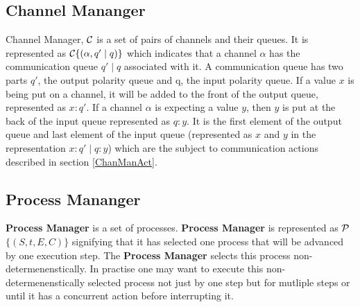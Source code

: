 \documentclass[11pt]{article}
\newcommand{\<}{\langle}
\renewcommand{\>}{\rangle}
\begin{document}
\subsection {Channel Mananger}
Channel Manager, $\cal C$ is a set of pairs of channels and their queues. It is represented as  ${\cal C}\{ (\alpha,q' \mid q) \}$ which indicates that a channel $\alpha$ has the communication queue $q' \mid q$ associated with it. A communication queue has two parts $q'$, the output polarity queue and q, the input polarity queue. If a value $x$ is being put on a channel, it will be added to the front of the output queue, represented as $x:q'$. If a channel $\alpha$ is expecting a value $y$, then $y$ is put at the back of the input queue represented as $q:y$. It is the first element of the output queue and last element of the input queue (represented as $x$ and $y$ in the representation $x:q' \mid q:y$) which are the subject to communication actions described in section \ref {ChanManAct}. 
\subsection {Process Mananger}
{\bf Process Manager} is a set of processes. {\bf Process Manager} is represented as $\cal P$ $\{(S,t,E,C)\}$ signifying that it has selected one process that will be advanced by one execution step. The {\bf Process Manager} selects this process non-determenenstically. In practise one may want to execute this non-determenenstically selected process not just by one step but for mutliple steps or until it has a concurrent action before interrupting it.
\end{document}
